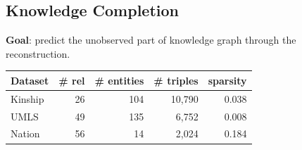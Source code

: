 \documentclass[a0,landscape]{a0poster}
\begin{document}
\begin{multicols}{3}
\section{Knowledge Completion}
\noindent\textbf{Goal}: predict the unobserved part of knowledge graph through the reconstruction.



\vspace{.5cm}

\begin{center}
\begin{tabular}{l | r | r | r | r}
Dataset &  \# rel & \# entities & \# triples & sparsity \\ \hline
Kinship & 26 & 104  & 10,790 & 0.038 \\
UMLS & 49 &135  & 6,752 & 0.008 \\
Nation & 56 & 14  & 2,024 & 0.184 \\
\end{tabular}
\end{center}

\vspace{1cm}


\vspace{.5cm}


\end{multicols}
\end{document}
